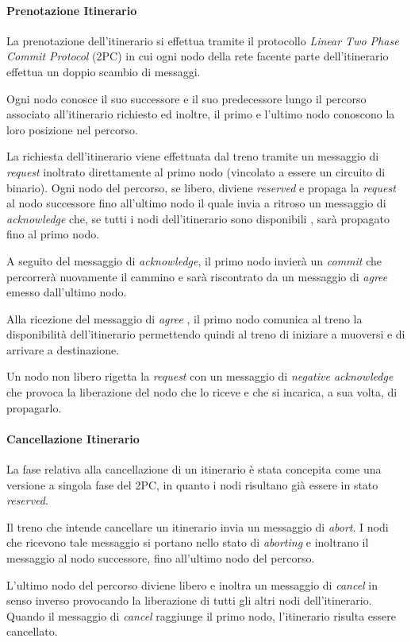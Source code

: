 \documentclass[10pt,a4paper,oneside]{report}
\begin{document}
\paragraph*{Prenotazione Itinerario}
La prenotazione dell'itinerario si effettua tramite il protocollo \emph{Linear Two Phase Commit Protocol } (2PC) in cui ogni nodo della rete facente parte dell'itinerario effettua un doppio scambio di messaggi.

Ogni nodo conosce il suo successore e il suo predecessore lungo il percorso associato all'itinerario richiesto ed inoltre, il primo e l'ultimo nodo conoscono la loro posizione nel percorso.

La richiesta dell'itinerario viene effettuata dal treno tramite un messaggio di \emph{request} inoltrato direttamente al primo nodo (vincolato a essere un circuito di binario). Ogni nodo del percorso, se libero, diviene \emph{reserved} e propaga la \emph{request} al nodo successore fino all'ultimo nodo il quale invia a ritroso un messaggio di \emph{acknowledge} che, se tutti i nodi dell'itinerario sono disponibili , sarà propagato fino al primo nodo.

A seguito del messaggio di \emph{acknowledge}, il primo nodo invierà un \emph{commit} che percorrerà nuovamente il cammino e sarà riscontrato da un messaggio di \emph{agree} emesso dall'ultimo nodo.

Alla ricezione del messaggio di \emph{agree} , il primo nodo comunica al treno la disponibilità dell'itinerario permettendo quindi al treno di iniziare a muoversi e di arrivare a destinazione.

Un nodo non libero rigetta la \emph{request} con un messaggio di \emph{negative acknowledge} che provoca la liberazione del nodo che lo riceve e che si incarica, a sua volta, di propagarlo.

\paragraph*{Cancellazione Itinerario}
La fase relativa alla cancellazione di un itinerario è stata concepita come una versione a singola fase del 2PC, in quanto i nodi risultano già essere in stato \emph{reserved}.

Il treno che intende cancellare un itinerario invia un messaggio di \emph{abort}. I nodi che ricevono tale messaggio si portano nello stato di \emph{aborting} e inoltrano il messaggio al nodo successore, fino all'ultimo nodo del percorso.

L'ultimo nodo del percorso diviene libero e inoltra un messaggio di \emph{cancel} in senso inverso provocando la liberazione di tutti gli altri nodi dell'itinerario. Quando il messaggio di \emph{cancel} raggiunge il primo nodo, l'itinerario risulta essere cancellato.
\end{document}
